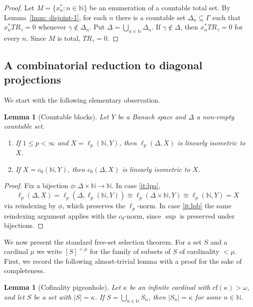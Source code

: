 \documentclass[11pt]{amsart}
\theoremstyle{plain}
\newtheorem{lemma}[theorem]{Lemma}
\theoremstyle{definition}
\numberwithin{equation}{section}
\newcommand{\abs}[1]{\left|#1\right|}
\newcommand{\N}{\mathbb{N}}
\newcommand{\cf}{\mathrm{cf}}
\renewcommand{\le}{\leqslant}
\begin{document}
\begin{proof}
Let $M = \{x_n^*: n \in \mathbb{N}\}$ be an enumeration of a countable total set.  By Lemma~\ref{lmm: disjoint-1}, for each $n$ there is a countable set $\Delta_n\subseteq\Gamma$ such that $x_n^*TR_\gamma=0$ whenever $\gamma\notin\Delta_n$.  Put $\Delta=\bigcup_{n\in\N}\Delta_n$.  If $\gamma\notin\Delta$, then $x_n^*TR_\gamma=0$ for every $n$.  Since $M$ is total, $TR_\gamma=0$.
\end{proof}

\subsection{A combinatorial reduction to diagonal projections}\label{sec:diagonal}

We start with the following elementary observation.

\begin{lemma}[Countable blocks]\label{lem:countable-blocks-lp-c0}
Let $Y$ be a Banach space and $\Delta$ a non-empty countable set.
\begin{enumerate}[label=(\alph*), ref=(\alph*)]
    \item\label{it:lpa} If $1\le p<\infty$ and $X=\ell_p(\N,Y)$, then $\ell_p(\Delta,X)$ is linearly isometric to $X$.
    \item \label{it:lpb} If $X=c_0(\N,Y)$, then $c_0(\Delta,X)$ is linearly isometric to $X$.
\end{enumerate}
\end{lemma}

\begin{proof}
Fix a bijection $\phi\colon \Delta\times\N\to\N$.
In case \ref{it:lpa},
\[
\ell_p(\Delta,X)=\ell_p(\Delta,\ell_p(\N,Y))\cong \ell_p(\Delta\times\N,Y)\cong \ell_p(\N,Y)=X
\]
via reindexing by $\phi$, which preserves the $\ell_p$-norm.
In case \ref{it:lpb} the same reindexing argument applies with the $c_0$-norm, since $\sup$ is preserved under bijections.
\end{proof}


We now present the standard free-set selection theorem. For a set $S$ and a cardinal $\mu$ we write $[S]^{<\mu}$ for the family of subsets of $S$ of cardinality $<\mu$. First, we record the following almost-trivial lemma with a proof for the sake of completeness.

\begin{lemma}[Cofinality pigeonhole]\label{lem:cofinal-pigeon}
Let $\kappa$ be an infinite cardinal with $\cf(\kappa)>\omega$, and let $S$ be a set with $\abs{S}=\kappa$.
If $S=\bigcup_{n\in\N} S_n$, then $\abs{S_n}=\kappa$ for some $n\in\N$.
\end{lemma}
\end{document}
